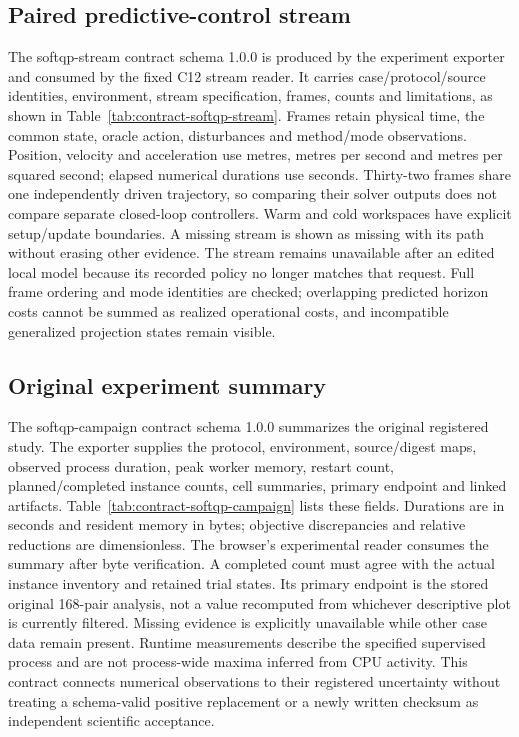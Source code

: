 \subsection{Paired predictive-control stream}\label{sec:contract-softqp-stream}
The softqp-stream contract schema 1.0.0 is produced by the experiment exporter
and consumed by the fixed C12 stream reader. It carries case/protocol/source
identities, environment, stream specification, frames, counts and limitations,
as shown in Table~\ref{tab:contract-softqp-stream}. Frames retain physical time,
the common state, oracle action, disturbances and method/mode observations.
Position, velocity and acceleration use metres, metres per second and metres
per squared second; elapsed numerical durations use seconds. Thirty-two
frames share one independently driven trajectory, so comparing their solver
outputs does not compare separate closed-loop controllers. Warm and cold
workspaces have explicit setup/update boundaries. A missing stream is shown
as missing with its path without erasing other evidence. The stream remains
unavailable after an edited local model because its recorded policy no longer
matches that request. Full frame ordering and mode identities are checked;
overlapping predicted horizon costs cannot be summed as realized operational
costs, and incompatible generalized projection states remain visible.


\subsection{Original experiment summary}\label{sec:contract-softqp-campaign} %
The softqp-campaign contract schema 1.0.0 summarizes the original registered %
study. The exporter supplies the protocol, environment, source/digest maps,
observed process duration, peak worker memory, restart count, planned/completed
instance counts, cell summaries, primary endpoint and linked artifacts.
Table~\ref{tab:contract-softqp-campaign} lists these fields. Durations are in %
seconds and resident memory in bytes; objective discrepancies and relative
reductions are dimensionless. The browser's experimental reader consumes the
summary after byte verification. A completed count must agree with the actual
instance inventory and retained trial states. Its primary endpoint is the
stored original 168-pair analysis, not a value recomputed from whichever
descriptive plot is currently filtered. Missing evidence is explicitly
unavailable while other case data remain present. Runtime measurements describe
the specified supervised process and are not process-wide maxima inferred
from CPU activity. This contract connects numerical observations to their
registered uncertainty without treating a schema-valid positive replacement
or a newly written checksum as independent scientific acceptance.

